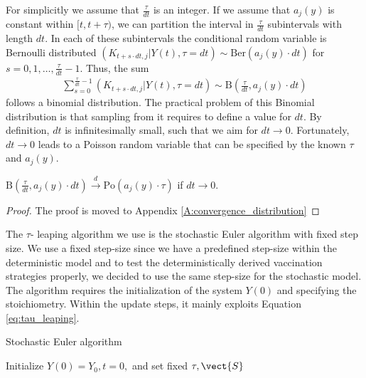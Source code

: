 For simplicitly we assume that $\frac{\tau}{dt}$ is an integer. If we assume that $a_j(y)$ is constant within $[t, t+\tau)$, we can partition the interval in $\frac{\tau}{dt}$ subintervals with length $dt$. In each of these subintervals the conditional random variable is Bernoulli distributed $\left(K_{t+s \cdot dt,j}|Y(t), \tau =dt\right) \sim \mathrm{Ber}(a_j(y) \cdot dt)$ for $s=0, 1, \dots, \frac{\tau}{dt} - 1$. Thus, the sum
\begin{align}
\sum_{s=0}^{\frac{\tau}{dt}-1} \left(K_{t+s \cdot dt, j} | Y(t), \tau = dt\right) \sim \textrm{B}\left(\frac{\tau}{dt}, a_j(y) \cdot dt\right)
\end{align}
follows a binomial distribution. The practical problem of this Binomial distribution is that sampling from it requires to define a value for $dt$. By definition, $dt$ is infinitesimally  small, such that we aim for $dt \to 0$. Fortunately, $dt \to 0$ leads to a Poisson random variable that can be specified by the known $\tau$ and $a_j(y)$.
\begin{theorem}
$\textrm{B}\left(\frac{\tau}{dt}, a_j(y) \cdot dt\right) \xrightarrow{d} \textrm{Po}(a_j(y) \cdot \tau)$ if $dt \to 0$.
\end{theorem}
\begin{proof}
The proof is moved to Appendix \ref{A:convergence_distribution}
\end{proof}

The $\tau$- leaping algorithm we use is the stochastic Euler algorithm with fixed step size. We use a fixed step-size since we have a predefined step-size within the deterministic model and to test the deterministically derived vaccination strategies properly, we decided to use the same step-size for the stochastic model. The algorithm requires the initialization of the system $Y(0)$ and specifying the stoichiometry. Within the update steps, it mainly exploits Equation \eqref{eq:tau_leaping}.\\

\begin{algorithm}[H]
 \caption{Stochastic Euler algorithm}
\SetAlgoLined
{}
 Initialize $Y(0) = Y_0, t=0,$ and set fixed $\tau, \vect{S}$\;

\end{algorithm}

